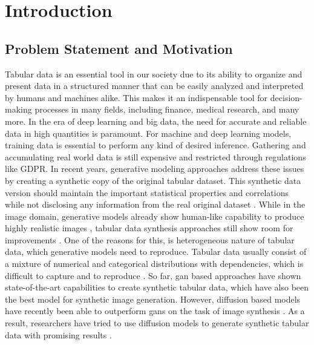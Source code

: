 \chapter{Introduction}
\label{ch:introduction}

\section{Problem Statement and Motivation} 
\label{ch:intro-problemStatement}

Tabular data is an essential tool in our society due to its ability to organize and present data in a structured manner that can be easily analyzed and interpreted by humans and machines alike. 
This makes it an indispensable tool for decision-making processes in many fields, including finance, medical research, and many more.
In the era of deep learning and big data, the need for accurate and reliable data in high quantities is paramount.
For machine and deep learning models, training data is essential to perform any kind of desired inference.
Gathering and accumulating real world data is still expensive and restricted through regulations like GDPR.
In recent years, generative modeling approaches address these issues by creating a synthetic copy of the original tabular dataset.
This synthetic data version should maintain the important statistical properties and correlations while not disclosing any information from the real original dataset \cite{goodfellow2020GenerativeAdversarialNetworks, mottini2018AirlinePassengerName}.
While in the image domain, generative models already show human-like capability to produce highly realistic images \cite{dhariwal2021DiffusionModelsBeat},
tabular data synthesis approaches still show room for improvements \cite{chundawat2022UniversalMetricRobust}.
One of the reasons for this, is heterogeneous nature of tabular data, which generative models need to reproduce.
Tabular data usually consist of a mixture of numerical and categorical distributions with dependencies, which is difficult to capture and to reproduce \cite{borisov2022DeepNeuralNetworks}.
So far, \gls{gan} based approaches have shown state-of-the-art capabilities to create synthetic tabular data, which have also been the best model for synthetic image generation.
However, diffusion based models have recently been able to outperform \glspl{gan} on the task of image synthesis \cite{dhariwal2021DiffusionModelsBeat}.
As a result, researchers have tried to use diffusion models to generate synthetic tabular data with promising results \cite{kotelnikov2022TabDDPMModellingTabular, zheng2022DiffusionModelsMissing}.

